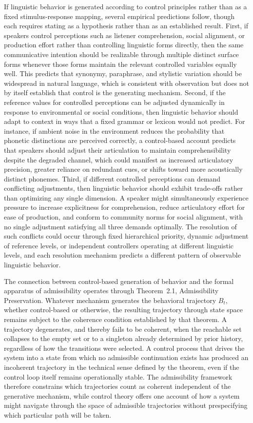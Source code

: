 If linguistic behavior is generated according to control principles rather than as a fixed stimulus-response mapping, several empirical predictions follow, though each requires stating as a hypothesis rather than as an established result. First, if speakers control perceptions such as listener comprehension, social alignment, or production effort rather than controlling linguistic forms directly, then the same communicative intention should be realizable through multiple distinct surface forms whenever those forms maintain the relevant controlled variables equally well. This predicts that synonymy, paraphrase, and stylistic variation should be widespread in natural language, which is consistent with observation but does not by itself establish that control is the generating mechanism. Second, if the reference values for controlled perceptions can be adjusted dynamically in response to environmental or social conditions, then linguistic behavior should adapt to context in ways that a fixed grammar or lexicon would not predict. For instance, if ambient noise in the environment reduces the probability that phonetic distinctions are perceived correctly, a control-based account predicts that speakers should adjust their articulation to maintain comprehensibility despite the degraded channel, which could manifest as increased articulatory precision, greater reliance on redundant cues, or shifts toward more acoustically distinct phonemes. Third, if different controlled perceptions can demand conflicting adjustments, then linguistic behavior should exhibit trade-offs rather than optimizing any single dimension. A speaker might simultaneously experience pressure to increase explicitness for comprehension, reduce articulatory effort for ease of production, and conform to community norms for social alignment, with no single adjustment satisfying all three demands optimally. The resolution of such conflicts could occur through fixed hierarchical priority, dynamic adjustment of reference levels, or independent controllers operating at different linguistic levels, and each resolution mechanism predicts a different pattern of observable linguistic behavior.

The connection between control-based generation of behavior and the formal apparatus of admissibility operates through Theorem~2.1, Admissibility Preservation. Whatever mechanism generates the behavioral trajectory $B_t$, whether control-based or otherwise, the resulting trajectory through state space remains subject to the coherence condition established by that theorem. A trajectory degenerates, and thereby fails to be coherent, when the reachable set collapses to the empty set or to a singleton already determined by prior history, regardless of how the transitions were selected. A control process that drives the system into a state from which no admissible continuation exists has produced an incoherent trajectory in the technical sense defined by the theorem, even if the control loop itself remains operationally stable. The admissibility framework therefore constrains which trajectories count as coherent independent of the generative mechanism, while control theory offers one account of how a system might navigate through the space of admissible trajectories without prespecifying which particular path will be taken.

